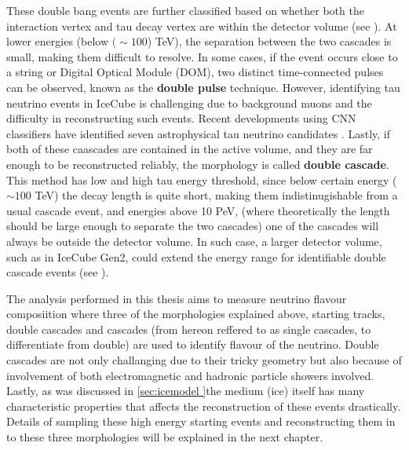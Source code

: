 These double bang events are further classified based on whether both the interaction vertex and tau decay vertex are within the detector volume (see ). At lower energies (below $(\sim 100$) TeV), the separation between the two cascades is small, making them difficult to resolve. In some cases, if the event occurs close to a string or Digital Optical Module (DOM), two distinct time-connected pulses can be observed, known as the \textbf{double pulse} technique. However, identifying tau neutrino events in IceCube is challenging due to background muons and the difficulty in reconstructing such events. Recent developments using CNN classifiers have identified seven astrophysical tau neutrino candidates . Lastly, if both of these caascades are contained in the active volume, and they are far enough to be reconstructed reliably, the morphology is called \textbf{double cascade}. This method has low and high tau energy threshold, since below certain energy ($\sim100$ TeV) the decay length is quite short, making them indistinugishable from a usual cascade event, and energies above 10 PeV, (where theoretically  the length should be  large enough to separate the two cascades) one of the cascades will always be outside the detector volume. In such case, a larger detector volume, such as in IceCube Gen2, could extend the energy range for identifiable double cascade events (see ). 

The analysis performed in this thesis aims to measure neutrino flavour composiition where three of the morphologies explained above, starting tracks, double cascades and cascades (from hereon reffered to as single cascades, to differentiate from double) are used to identify flavour of the neutrino. Double cascades are not only challanging due to their tricky geometry but also because of involvement of both electromagnetic and hadronic particle showers involved. Lastly, as was discussed in \ref{sec:icemodel }the medium (ice) itself has many characteristic properties that affects the reconstruction of these events drastically. Details of sampling these high energy starting events and reconstructing them in to these three morphologies will be explained in the next chapter. 






     
